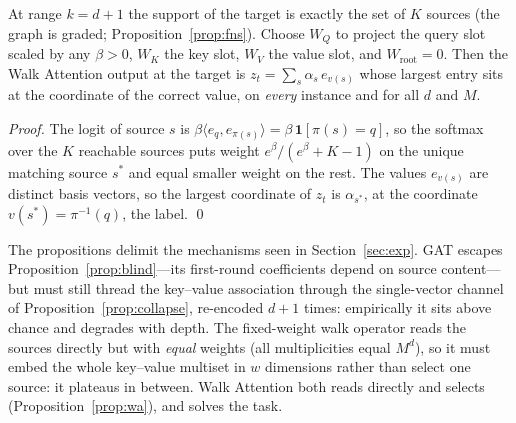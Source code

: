 \begin{proposition}\label{prop:wa}
At range $k=d{+}1$ the support of the target is exactly the set of $K$ sources
(the graph is graded; Proposition~\ref{prop:fns}). Choose $W_Q$ to project the
query slot scaled by any $\beta>0$, $W_K$ the key slot, $W_V$ the value slot,
and $W_{\!\text{root}}=0$. Then the Walk Attention output at the target is
$z_t=\sum_s \alpha_s\,e_{v(s)}$ whose largest entry sits at the coordinate of
the correct value, on \emph{every} instance and for all $d$ and $M$.
\end{proposition}

\begin{proof}
The logit of source $s$ is $\beta\langle e_q, e_{\pi(s)}\rangle
=\beta\,\mathbf{1}[\pi(s)=q]$, so the softmax over the $K$ reachable sources
puts weight $e^{\beta}/(e^{\beta}+K-1)$ on the unique matching source $s^\ast$
and equal smaller weight on the rest. The values $e_{v(s)}$ are distinct basis
vectors, so the largest coordinate of $z_t$ is $\alpha_{s^\ast}$, at the
coordinate $v(s^\ast)=\pi^{-1}(q)$, the label. \qed
\end{proof}

\begin{remark}\label{rem:mechanisms}
The propositions delimit the mechanisms seen in Section~\ref{sec:exp}. GAT
escapes Proposition~\ref{prop:blind}---its first-round coefficients depend on
source content---but must still thread the key--value association through the
single-vector channel of Proposition~\ref{prop:collapse}, re-encoded $d{+}1$
times: empirically it sits above chance and degrades with depth. The
fixed-weight walk operator reads the sources directly but with \emph{equal}
weights (all multiplicities equal $M^{d}$), so it must embed the whole
key--value multiset in $w$ dimensions rather than select one source: it
plateaus in between. Walk Attention both reads directly and selects
(Proposition~\ref{prop:wa}), and solves the task.
\end{remark}
